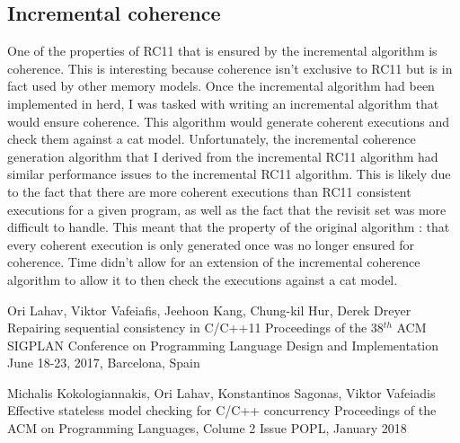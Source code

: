\documentclass[a4,11pt,dvipsnames]{article}
\begin{document}
\subsection{Incremental coherence}

One of the properties of RC11 that is ensured by the incremental algorithm is coherence. This is interesting because coherence isn't exclusive to RC11 but is in fact used by other memory models. Once the incremental algorithm had been implemented in herd, I was tasked with writing an incremental algorithm that would ensure coherence. This algorithm would generate coherent executions and check them against a cat model. Unfortunately, the incremental coherence generation algorithm that I derived from the incremental RC11 algorithm had similar performance issues to the incremental RC11 algorithm. This is likely due to the fact that there are more coherent executions than RC11 consistent executions for a given program, as well as the fact that the revisit set was more difficult to handle. This meant that the property of the original algorithm : that every coherent execution is only generated once was no longer ensured for coherence. Time didn't allow for an extension of the incremental coherence algorithm to allow it to then check the executions against a cat model.

\begin{thebibliography}{9}

	Ori Lahav, Viktor Vafeiafis, Jeehoon Kang, Chung-kil Hur, Derek Dreyer
	Repairing sequential consistency in C/C++11
	Proceedings of the 38$^{th}$ ACM SIGPLAN Conference on Programming Language Design and Implementation
	June 18-23, 2017, Barcelona, Spain

	Michalis Kokologiannakis, Ori Lahav, Konstantinos Sagonas, Viktor Vafeiadis
	Effective stateless model checking for C/C++ concurrency
	Proceedings of the ACM on Programming Languages, Colume 2 Issue POPL,
	January 2018
\end{thebibliography}
\end{document}
